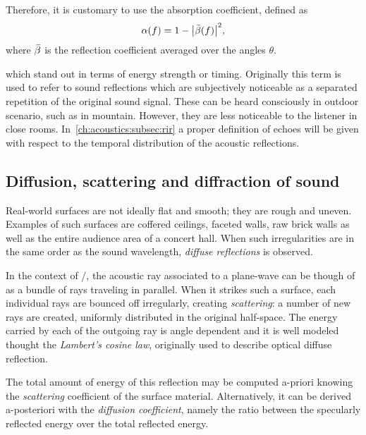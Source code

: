 Therefore, it is customary to use the absorption coefficient, defined as
\begin{equation}
    \absCoeff(f) = 1 - \abs{\bar{\reflCoeff}(f)}^2
    ,
\end{equation}
where $\bar{\beta}$ is the reflection coefficient averaged over the angles $\theta$.

 which stand out in terms of energy strength or timing.
Originally this term is used to refer to sound reflections which are subjectively noticeable as a separated repetition of the original sound signal.
These can be heard consciously in outdoor scenario, such as in mountain. However, they are less noticeable to the listener in close rooms.
In~\cref{ch:acoustics:subsec:rir} a proper definition of echoes will be given with respect to the temporal distribution of the acoustic reflections.

\subsection{Diffusion, scattering and diffraction of sound}
Real-world surfaces are not ideally flat and smooth; they are rough and uneven.
Examples of such surfaces are coffered ceilings, faceted walls, raw brick walls as well as the entire audience area of a concert hall.
When such irregularities are in the same order as the sound wavelength, \textit{diffuse reflections} is observed.

In the context of \GA/, the acoustic ray associated to a plane-wave can be though of as a bundle of rays traveling in parallel.
When it strikes such a surface, each individual rays are bounced off irregularly, creating \textit{scattering}:
a number of new rays are created, uniformly distributed in the original half-space.
The energy carried by each of the outgoing ray is angle dependent and it
is well modeled thought the \textit{Lambert's cosine law}, originally used to describe optical diffuse reflection.

The total amount of energy of this reflection may be computed a-priori
knowing the \textit{scattering} coefficient of the surface material.
Alternatively, it can be derived a-posteriori with the \textit{diffusion coefficient}, namely the ratio between
the specularly reflected energy over the total reflected energy.


